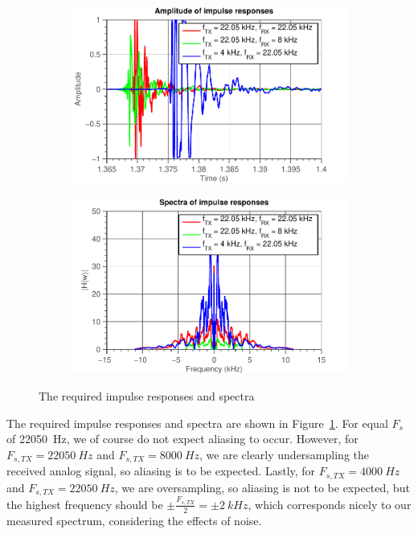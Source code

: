 \documentclass[11pt,titlepage]{report}
\begin{document}
\begin{figure}[H]
	\centering
	\begin{subfigure}{0.49\textwidth}
		\includegraphics[width=\textwidth]{../../deliverable-7-resources/figures/ass-1/report-11-12-13/ass-1-report-11-time.pdf}
	\end{subfigure}
	\begin{subfigure}{0.49\textwidth}
		\includegraphics[width=\textwidth]{../../deliverable-7-resources/figures/ass-1/report-11-12-13/ass-1-report-11.pdf}
	\end{subfigure}
	\caption{The required impulse responses and spectra}
	\label{fig:rep11-impulse-spectra}
\end{figure}

The required impulse responses and spectra are shown in Figure~\ref{fig:rep11-impulse-spectra}. For equal $F_s$ of \SI{22050}{Hz}, we of course do not expect aliasing to occur. However, for $F_{s,TX} = \SI{22050}{Hz}$ and $F_{s,TX} = \SI{8000}{Hz}$, we are clearly undersampling the received analog signal, so aliasing is to be expected. Lastly, for $F_{s,TX} = \SI{4000}{Hz}$ and $F_{s,TX} = \SI{22050}{Hz}$, we are oversampling, so aliasing is not to be expected, but the highest frequency should be $\pm \frac{F_{s,TX}}{2} = \pm \SI{2}{kHz}$, which corresponds nicely to our measured spectrum, considering the effects of noise.
\end{document}
